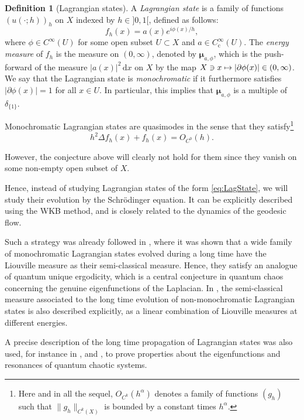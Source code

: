 \documentclass[10pt]{amsart}
\newcommand\mto{\mathchoice{\longmapsto}{\mapsto}{\mapsto}{\mapsto}}
\newcommand{\rc}{\mathrm{c}}
\newcommand{\rd}{\,\mathrm{d}}
\theoremstyle{plain}
\theoremstyle{definition}
\newtheorem{definition}[theorem]{Definition}
\begin{document}
\begin{definition}[Lagrangian states]\label{def:LagStat}
A \emph{Lagrangian state} is a family of functions $(u(\cdot;h))_h$ on $X$ indexed by $h\in{}]0,1[$, defined as follows:\vspace{-3pt}
\begin{equation}\label{eq:LagState}
f_h(x)=a(x)e^{i\phi(x)/h},
\end{equation}
where $\phi\in C^\infty(U)$ for some open subset $U\subset X$ and $a\in C_\rc^\infty(U)$. The \emph{energy measure} of $f_h$ is the measure on $(0,\infty)$, denoted by $\boldsymbol{\mu}_{a,\phi}$, which is the push-forward of the measure $|a(x)|^2 \rd x$ on $X$ by the map $X\ni x \mto |\partial\phi(x)|\in (0,\infty)$. We say that the Lagrangian state is \emph{monochromatic} if it furthermore satisfies $|\partial \phi(x)|=1$ for all $x\in U$. In particular, this implies that $\boldsymbol{\mu}_{a,\phi}$ is a multiple of $\delta_{\{1\}}$.
\end{definition}

Monochromatic Lagrangian states are quasimodes in the sense that they satisfy\footnote{Here and in all the sequel, $O_{C^k}(h^\alpha)$ denotes a family of functions $(g_h)$ such that $\|g_h\|_{C^k(X)}$ is bounded by a constant times $h^\alpha$.}\vspace{-3pt}
\[
h^2\Delta f_h(x)+f_h(x)=O_{C^0}(h).
\]

However, the conjecture above will clearly not hold for them since they vanish on some non-empty open subset of $X$.

Hence, instead of studying Lagrangian states of the form \eqref{eq:LagState}, we will study their evolution by the Schrödinger equation. It can be explicitly described using the WKB method, and is closely related to the dynamics of the geodesic flow.

Such a strategy was already followed in \cite{Schu}, where it was shown that a wide family of monochromatic Lagrangian states evolved during a long time have the Liouville measure as their semi-classical measure. Hence, they satisfy an analogue of quantum unique ergodicity, which is a central conjecture in quantum chaos concerning the genuine eigenfunctions of the Laplacian. In \cite{Schu}, the semi-classical measure associated to the long time evolution of non-monochromatic Lagrangian states is also described explicitly, as a linear combination of Liouville measures at different energies.

A precise description of the long time propagation of Lagrangian states was also used, for instance in \cite{Anan}, \cite{AN} and \cite{NZ}, to prove properties about the eigenfunctions and resonances of quantum chaotic systems.
\end{document}
